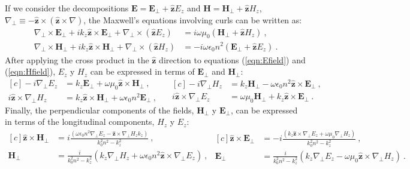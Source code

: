 If we consider the decompositions $\textbf{E}=\textbf{E}_\perp +\hat{\textbf{z}} E_z$ and $\textbf{H}=\textbf{H}_\perp +\hat{\textbf{z}} H_z$, $\nabla_\perp \equiv - \hat{\textbf{z}}\times (\hat{\textbf{z}}\times\nabla)   $, the Maxwell's equations involving curls can be written as:
\begin{align}
	\nabla_\perp \times  \textbf{E}_\perp + ik_z \hat{\textbf{z}} \times \textbf{E}_\perp + \nabla_\perp \times (\hat{\textbf{z}} E_z) &= i\omega\mu_0(\textbf{H}_\perp +\hat{\textbf{z}} H_z) \ ,
	\label{eqn:Efield}
	\\
	\nabla_\perp \times  \textbf{H}_\perp + ik_z \hat{\textbf{z}} \times \textbf{H}_\perp + \nabla_\perp \times (\hat{\textbf{z}} H_z) &= -i\omega \epsilon_0 n^2 (\textbf{E}_\perp +\hat{\textbf{z}} E_z) \ .
	\label{eqn:Hfield}
\end{align}
After applying the cross product in the $\hat{\textbf{z}}$ direction to equations (\ref{eqn:Efield}) and (\ref{eqn:Hfield}),  $E_z$ y $H_z$  can be expressed in terms of $\textbf{E}_\perp$ and $\textbf{H}_\perp$:
\begin{equation*}
\begin{aligned}[c]
	 -i\nabla_\perp E_z &= k_z\textbf{E}_\perp +\omega \mu_0 \hat{\textbf{z}} \times \textbf{H}_\perp \ ,
	 	  	 \\
	 	  	i\hat{\textbf{z}} \times \nabla_\perp H_z &= k_z \hat{\textbf{z}} \times\textbf{H}_\perp + \omega\epsilon_0 n^2 \textbf{E}_\perp \ ,
\end{aligned} 
\quad
\begin{aligned}[c]
	-i \nabla_\perp H_z &= k_z \textbf{H}_\perp - \omega \epsilon_0 n^2  \hat{\textbf{z}} \times \textbf{E}_\perp \ ,
	\\
	i\hat{\textbf{z}} \times\nabla_\perp E_z &=  \omega \mu_0 \textbf{H}_\perp+k_z  \hat{\textbf{z}} \times \textbf{E}_\perp \ .
\end{aligned}
\end{equation*}
Finally, the perpendicular components of the fields,  $\textbf{H}_\perp$ y $\textbf{E}_\perp$, can be expressed in terms of the longitudinal components, $H_z$ y $E_z$:
\begin{equation}
\begin{aligned}[c]
 \hat{\textbf{z}} \times \textbf{H}_\perp &= i\frac{(\omega\epsilon_0 n^2 \nabla_\perp E_z  - \hat{\textbf{z}} \times \nabla_\perp H_z k_z)}{k_0^2 n^2 - k_z^2} \ ,
 \\
\textbf{H}_\perp &= \frac{i}{k_0^2 n^2 - k_z^2}\left(k_z\nabla_\perp H_z + \omega \epsilon_0 n^2\hat{\textbf{z}} \times \nabla_\perp E_z\right) \ ,
\end{aligned}
\begin{aligned}[c]
	\hat{\textbf{z}} \times \textbf{E}_\perp &= -i\frac{(k_z\hat{\textbf{z}} \times \nabla_\perp E_z + \omega\mu_0 \nabla_\perp H_z)  }{k_0^2 n^2 - k_z^2} \ ,
	\\
\textbf{E}_\perp &= \frac{i}{k_0^2 n^2 - k_z^2}\left(k_z \nabla_\perp E_z - \omega\mu_0 \hat{\textbf{z}} \times \nabla_\perp H_z\right) \ . \label{eqn:transversal}
\end{aligned}
\end{equation}
